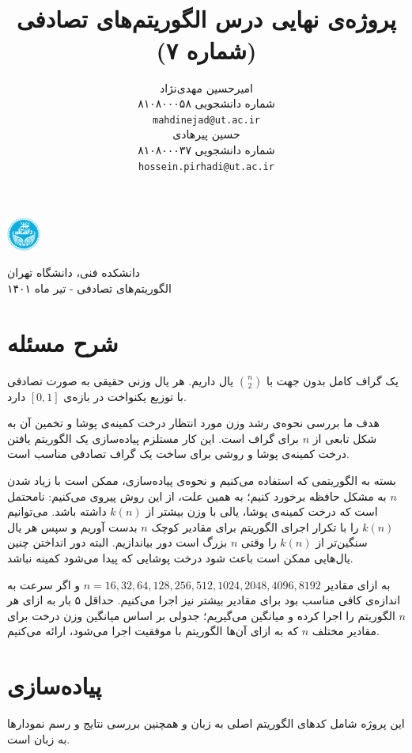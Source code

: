\documentclass{article}
\title{
\lr{An Exploratory Assignment on Minimum Spanning Trees}\\
پروژه‌ی نهایی درس الگوریتم‌های تصادفی (شماره ۷)
}
\author{%
  امیرحسین مهدی‌نژاد\\
  شماره دانشجویی ۸۱۰۸۰۰۰۵۸\\
  \texttt{mahdinejad@ut.ac.ir} \\
   \And
  حسین پیرهادی\\
  شماره دانشجویی ۸۱۰۸۰۰۰۳۷\\
  \texttt{hossein.pirhadi@ut.ac.ir}
}
\begin{document}
\begin{minipage}{0.1\textwidth}%
\includegraphics[width=1.1cm]{Photos/UT_logo.png}
\end{minipage}%
\hfill%
\begin{minipage}{0.9\textwidth}\raggedleft
دانشکده فنی، دانشگاه تهران\\
الگوریتم‌های تصادفی -  
تیر
ماه ۱۴۰۱\\
\end{minipage}

\makepertitle

\section{شرح مسئله}
یک گراف کامل بدون جهت با
$\binom{n}{2}$
یال داریم.
هر یال وزنی حقیقی به صورت تصادفی با توزیع یکنواخت در بازه‌ی
$\left[0,1\right]$
دارد.

هدف ما بررسی نحوه‌ی رشد وزن مورد انتظار درخت کمینه‌ی پوشا و تخمین آن به شکل تابعی از
$n$
برای گراف است.
این کار مستلزم پیاده‌سازی یک الگوریتم یافتن درخت کمینه‌ی پوشا و روشی برای ساخت یک گراف تصادفی مناسب است.

بسته به الگوریتمی که استفاده می‌کنیم و نحوه‌ی پیاده‌سازی، ممکن است با زیاد شدن
$n$
به مشکل حافظه برخورد کنیم؛ به همین علت، از این روش پیروی می‌کنیم: نامحتمل است که درخت کمینه‌ی پوشا، یالی با وزن بیشتر از
$k(n)$
داشته باشد. می‌توانیم 
$k(n)$
را با تکرار اجرای الگوریتم برای مقادیر کوچک
$n$
بدست آوریم و سپس هر یال سنگین‌تر از
$k(n)$
را وقتی
$n$
بزرگ است دور بیاندازیم. البته دور انداختن چنین یال‌هایی ممکن است باعث شود درخت پوشایی که پیدا می‌شود کمینه نباشد.

به ازای مقادیر
$n=16, 32, 64, 128, 256, 512, 1024, 2048, 4096, 8192$
و اگر سرعت به اندازه‌ی کافی مناسب بود برای مقادیر بیشتر نیز اجرا می‌کنیم.
حداقل ۵ بار به ازای هر
$n$
الگوریتم را اجرا کرده و میانگین می‌گیریم؛ جدولی بر اساس میانگین وزن درخت برای مقادیر مختلف
$n$
که به ازای آن‌ها الگوریتم با موفقیت اجرا می‌شود، ارائه می‌کنیم.

\section{پیاده‌سازی}
این پروژه شامل کدهای الگوریتم اصلی به زبان
و همچنین بررسی نتایج و رسم نمودارها به زبان
است.
\end{document}
